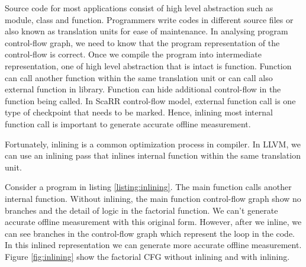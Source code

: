 
Source code for most applications consist of high level abstraction such as
module, class and function. Programmers write codes in different source files or
also known as translation units for ease of maintenance. In analysing program
control-flow graph, we need to know that the program representation of the
control-flow is correct. Once we compile the program into intermediate
representation, one of high level abstraction that is intact is function.
Function can call another function within the same translation unit or can call
also external function in library. Function can hide additional control-flow in
the function being called. In ScaRR control-flow model, external function call
is one type of checkpoint that needs to be marked. Hence, inlining most internal
function call is important to generate accurate offline measurement. 

Fortunately, inlining is a common optimization process in compiler. In LLVM, we
can use an inlining pass that inlines internal function within the same
translation unit.


Consider a program in listing \ref{listing:inlining}. The main function calls
another internal function. Without inlining, the main function control-flow
graph show no branches and the detail of logic in the factorial function. We
can't generate accurate offline measurement with this original form. However,
after we inline, we can see branches in the control-flow graph which represent
the loop in the code. In this inlined representation we can generate more
accurate offline measurement. Figure \ref{fig:inlining} show the factorial CFG
without inlining and with inlining.


